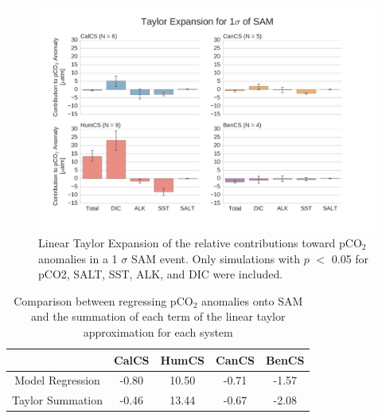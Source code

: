 \documentclass[12pt]{article}
\begin{document}
\clearpage
\begin{figure}[!h]
	\centering
	\includegraphics[width=\linewidth]{../../figs/all-systems/taylor_expansions/taylor-expansion-SAM-pCO2-PVALUEREMOVED-smoothedClimate.png}
	\caption{Linear Taylor Expansion of the relative contributions toward pCO$_{2}$ anomalies in a 1 $\sigma$ SAM event. Only simulations with $p$ $<$ 0.05 for pCO2, SALT, SST, ALK, and DIC were included.}
	\label{fig:taylor-sam}
\end{figure}
\begin{table}[!h]
	\centering
	\begin{tabular}{c | c c c c }
		& CalCS & HumCS & CanCS & BenCS \\
		\midrule
		Model Regression & -0.80 & 10.50 & -0.71 & -1.57 \\
		Taylor Summation & -0.46 & 13.44 & -0.67 & -2.08 \\
	\end{tabular}
	\caption{Comparison between regressing pCO$_{2}$ anomalies onto SAM and the summation of each term of the linear taylor approximation for each system}
	\label{tab:taylor-sam}
\end{table}

\clearpage

\end{document}
